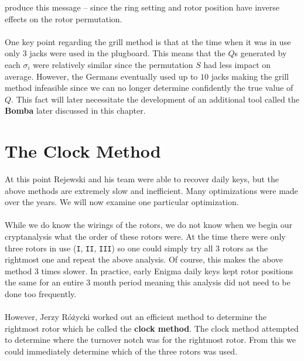 produce this message -- since the ring setting and rotor position
have inverse effects on the rotor permutation.
\\\\One key point regarding the grill method is that at the time when
it was in use only $3$ jacks were used in the plugboard. This means
that the $Q$s generated by each $\sigma_i$ were relatively similar
since the permutation $S$ had less impact on average. However, the
Germans eventually used up to $10$ jacks making the grill method
infeasible since we can no longer determine confidently the true
value of $Q$. This fact will later necessitate the development of an
additional tool called the {\bf{Bomba}} later discussed in this chapter.

\section{The Clock Method}\label{clock_method}

At this point Rejewski and his team were able to recover daily keys,
but the above methods are extremely slow and inefficient. Many
optimizations were made over the years. We will now examine one
particular optimization.
\\\\While we do know the wirings of the rotors, we do not know when
we begin our cryptanalysis what the order of these rotors were. At
the time there were only three rotors in use (\texttt{I},
\texttt{II}, \texttt{III}) so one could simply try all 3 rotors as
the rightmost one and repeat the above analysis. Of course, this
makes the above method 3 times slower. In practice, early Enigma
daily keys kept rotor positions the same for an entire 3 month period
meaning this analysis did not need to be done too frequently.
\\\\However, Jerzy Różycki worked out an efficient method to
determine the rightmost rotor which he called the {\bf{clock
			method}}. The clock method attempted to determine where the turnover
notch was for the rightmost rotor. From this we could immediately
determine which of the three rotors was used.

